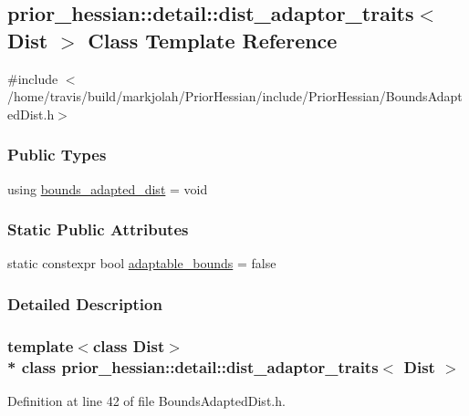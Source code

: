 \hypertarget{classprior__hessian_1_1detail_1_1dist__adaptor__traits}{}\subsection{prior\+\_\+hessian\+:\+:detail\+:\+:dist\+\_\+adaptor\+\_\+traits$<$ Dist $>$ Class Template Reference}
\label{classprior__hessian_1_1detail_1_1dist__adaptor__traits}


{\ttfamily \#include $<$/home/travis/build/markjolah/\+Prior\+Hessian/include/\+Prior\+Hessian/\+Bounds\+Adapted\+Dist.\+h$>$}

\subsubsection*{Public Types}
\begin{DoxyCompactItemize}
\item 
using \hyperlink{classprior__hessian_1_1detail_1_1dist__adaptor__traits_aa85b497e4ada11fdb03efd9507388da1}{bounds\+\_\+adapted\+\_\+dist} = void
\end{DoxyCompactItemize}
\subsubsection*{Static Public Attributes}
\begin{DoxyCompactItemize}
\item 
static constexpr bool \hyperlink{classprior__hessian_1_1detail_1_1dist__adaptor__traits_a81002efd56cd84ee09a839e72ec1d7c9}{adaptable\+\_\+bounds} = false
\end{DoxyCompactItemize}


\subsubsection{Detailed Description}
\subsubsection*{template$<$class Dist$>$\\*
class prior\+\_\+hessian\+::detail\+::dist\+\_\+adaptor\+\_\+traits$<$ Dist $>$}



Definition at line 42 of file Bounds\+Adapted\+Dist.\+h.



